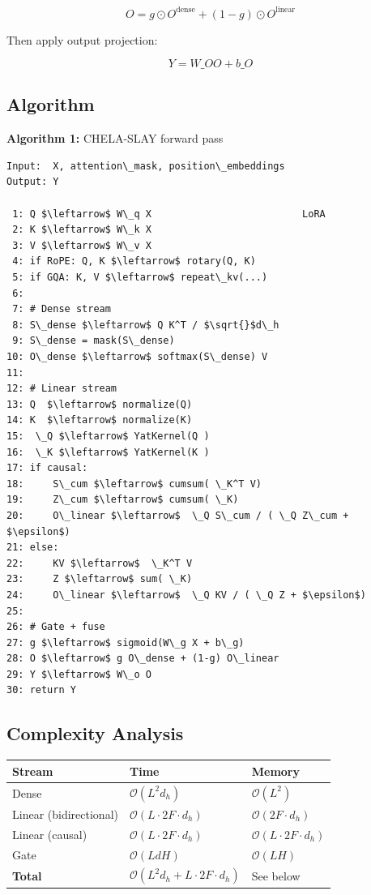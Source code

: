 \[
O = g \odot O^\text{dense} + (1 - g) \odot O^\text{linear}
\]

Then apply output projection:

\[
Y = W\_O O + b\_O
\]

\subsection{Algorithm}

\textbf{Algorithm 1:} CHELA-SLAY forward pass
\begin{lstlisting}
Input:  X, attention\_mask, position\_embeddings
Output: Y

 1: Q $\leftarrow$ W\_q X                          LoRA
 2: K $\leftarrow$ W\_k X
 3: V $\leftarrow$ W\_v X
 4: if RoPE: Q, K $\leftarrow$ rotary(Q, K)
 5: if GQA: K, V $\leftarrow$ repeat\_kv(...)
 6:
 7: # Dense stream
 8: S\_dense $\leftarrow$ Q K^T / $\sqrt{}$d\_h
 9: S\_dense = mask(S\_dense)
10: O\_dense $\leftarrow$ softmax(S\_dense) V
11:
12: # Linear stream
13: Q  $\leftarrow$ normalize(Q)
14: K  $\leftarrow$ normalize(K)
15:  \_Q $\leftarrow$ YatKernel(Q )
16:  \_K $\leftarrow$ YatKernel(K )
17: if causal:
18:     S\_cum $\leftarrow$ cumsum( \_K^T V)
19:     Z\_cum $\leftarrow$ cumsum( \_K)
20:     O\_linear $\leftarrow$  \_Q S\_cum / ( \_Q Z\_cum + $\epsilon$)
21: else:
22:     KV $\leftarrow$  \_K^T V
23:     Z $\leftarrow$ sum( \_K)
24:     O\_linear $\leftarrow$  \_Q KV / ( \_Q Z + $\epsilon$)
25:
26: # Gate + fuse
27: g $\leftarrow$ sigmoid(W\_g X + b\_g)
28: O $\leftarrow$ g O\_dense + (1-g) O\_linear
29: Y $\leftarrow$ W\_o O
30: return Y
\end{lstlisting}

\subsection{Complexity Analysis}

\begin{table}[H]
\centering
\small
\begin{tabular}{lll}
\toprule
\textbf{Stream} & \textbf{Time} & \textbf{Memory} \\
\midrule
Dense & $\mathcal{O}(L^2 d_h)$ & $\mathcal{O}(L^2)$ \\
Linear (bidirectional) & $\mathcal{O}(L \cdot 2F \cdot d_h)$ & $\mathcal{O}(2F \cdot d_h)$ \\
Linear (causal) & $\mathcal{O}(L \cdot 2F \cdot d_h)$ & $\mathcal{O}(L \cdot 2F \cdot d_h)$ \\
Gate & $\mathcal{O}(L d H)$ & $\mathcal{O}(L H)$ \\
\textbf{Total} & $\mathcal{O}(L^2 d_h + L \cdot 2F \cdot d_h)$ & See below \\
\bottomrule
\end{tabular}
\end{table}

